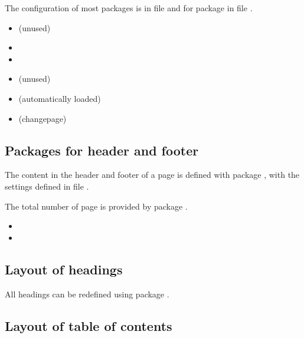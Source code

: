 The configuration of most packages is in file  and 
for package  in file .


\begin{itemize}[noitemsep]
\item {} (unused)
\item {}
\item {}
\item {} (unused)
\item {} (automatically loaded)
\item {} (changepage)
\end{itemize}


\subsection{Packages for header and footer}

The content in the header and footer of a page is defined with package 
, with the settings defined in file 
.

The total number of page is provided by package .

\begin{itemize}[noitemsep]
\item {}
\item {}
\end{itemize}


\subsection{Layout of headings}

All headings can be redefined using package .


\subsection{Layout of table of contents}

